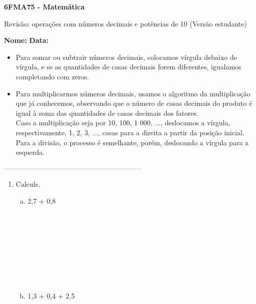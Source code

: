 \documentclass[a4paper,14pt]{article}
\begin{document}
	
	\noindent\textbf{6FMA75 - Matemática} 
	
	\begin{center}Revisão: operações com números decimais e potências de 10 (Versão estudante)
	\end{center}
	
	\noindent\textbf{Nome:} \underline{\hspace{10cm}}
	\noindent\textbf{Data:} \underline{\hspace{4cm}}
	
	
	\begin{multicols}{2}
		\noindent 
		\begin{itemize}
			\item Para somar ou subtrair números decimais, colocamos vírgula debaixo de vírgula, e se as quantidades de casas decimais forem diferentes, igualamos completando com zeros.
			\item Para multiplicarmos números decimais, usamos o algoritmo da multiplicação que já conhecemos, observando que o número de casas decimais do produto é igual à soma das quantidades de casas decimais dos fatores. \\
			Caso a multiplicação seja por 10, 100, 1 000, ..., deslocamos a vírgula, respectivamente, 1, 2, 3, ..., casas para a direita a partir da posição inicial. Para a divisão, o processo é semelhante, porém, deslocando a vírgula para a esquerda.
		\end{itemize}
		\noindent\textsubscript{-----------------------------------------------------------------------}
    	\begin{enumerate}
   			\item Calcule.
   			\begin{enumerate}[a)]
   				\item 2,7 + 0,8 \\\\\\\\\\\\\\\\\\
   				\item 1,3 + 0,4 + 2,5  \\\\\\\\\\\\\\\\\\

\end{enumerate}
\end{enumerate}
\end{multicols}
\end{document}
